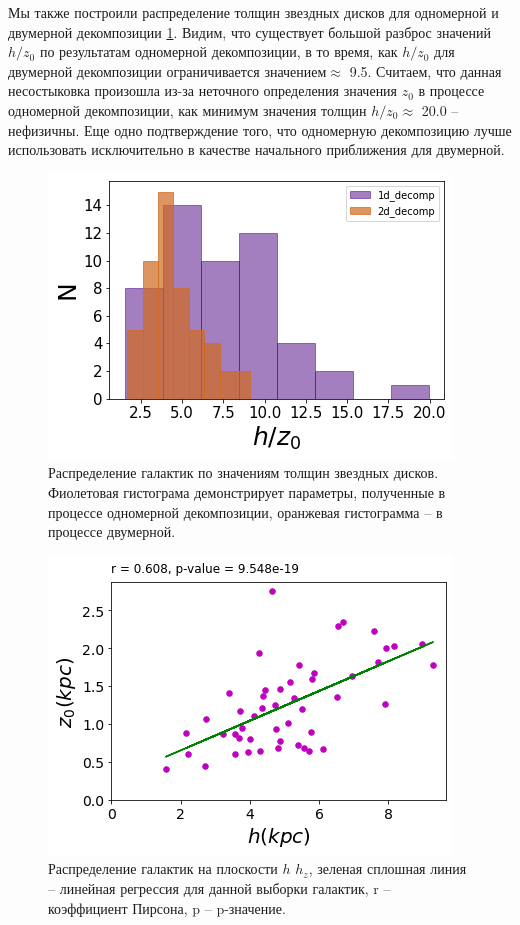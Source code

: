 Мы также построили распределение толщин звездных дисков для одномерной и двумерной декомпозиции \ref{fig:hr_hz_hist}. Видим, что существует большой разброс значений $h/z_0$ по результатам одномерной декомпозиции, в то время, как $h/z_0$ для двумерной декомпозиции ограничивается значением$\approx$ 9.5. Считаем, что данная несостыковка произошла из-за неточного определения значения $z_0$ в процессе одномерной декомпозиции, как минимум значения толщин $h/z_0 \approx$ 20.0 -- нефизичны. Еще одно подтверждение того, что одномерную декомпозицию лучше использовать исключительно в качестве начального приближения для двумерной.  
\begin{figure}[th]
    \centering
    \includegraphics[width=.8\textwidth]{plot_results/h_z0_hist.png}
    \caption{Распределение галактик по значениям толщин звездных дисков. Фиолетовая гистограма демонстрирует параметры, полученные в процессе одномерной декомпозиции, оранжевая гистограмма -- в процессе двумерной. }\label{fig:hr_hz_hist}
\end{figure}

\begin{figure}[th]
    \centering
    \includegraphics[width=.8\textwidth]{plot_results/h_r_z_0.png}
    \caption{Распределение галактик на плоскости $h$ $h_z$, зеленая сплошная линия -- линейная регрессия для данной выборки галактик, r -- коэффициент Пирсона, p -- p-значение. }\label{fig:hr_z_0}
\end{figure}

